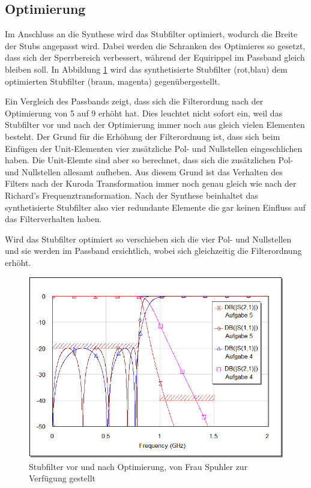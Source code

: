 \subsection{Optimierung}

Im Anschluss an die Synthese wird das Stubfilter optimiert, wodurch die Breite der Stubs angepasst wird. Dabei  werden  die
Schranken  des  Optimieres so gesetzt, dass sich der Sperrbereich  verbessert,
während  der  Equirippel  im   Passband  gleich  bleiben  soll.  In  Abbildung
\ref{fig:vor-nach-optimierung} wird  das  synthetisierte Stubfilter (rot,blau)
dem optimierten Stubfilter (braun, magenta) gegenübergestellt.

Ein Vergleich des  Passbands  zeigt,  dass  sich  die  Filterordung  nach  der
Optimierung  von 5 auf 9 erhöht hat. Dies leuchtet nicht sofort ein, weil  das
Stubfilter vor und nach der Optimierung immer noch aus gleich vielen Elementen
besteht.  Der  Grund  für die Erhöhung der Filterordnung ist, dass  sich  beim
Einfügen   der   Unit-Elementen   vier   zusätzliche   Pol-  und   Nullstellen
eingeschlichen  haben. Die Unit-Elemte sind aber so berechnet, dass  sich  die
zusätzlichen  Pol- und Nullstellen allesamt aufheben. Aus diesem  Grund  ist das Verhalten des Filters
nach der Kuroda Transformation immer noch genau  gleich  wie
nach  der Richard's Frequenztransformation. Nach der  Synthese  beinhaltet
das synthetisierte  Stubfilter  also  vier  redundante Elemente die gar keinen
Einfluss auf das Filterverhalten haben.

Wird  das  Stubfilter   optimiert  so  verschieben  sich  die  vier  Pol-  und
Nullstellen  und sie werden im Passband ersichtlich, wobei  sich  gleichzeitig
die Filterordnung erhöht.


\begin{figure}[h!]
    \centering
    \includegraphics[width=\linewidth]{images/graph-optimierung}
    \caption{Stubfilter vor und nach Optimierung, von Frau Spuhler zur Verfügung gestellt}
    \label{fig:vor-nach-optimierung}
\end{figure}

